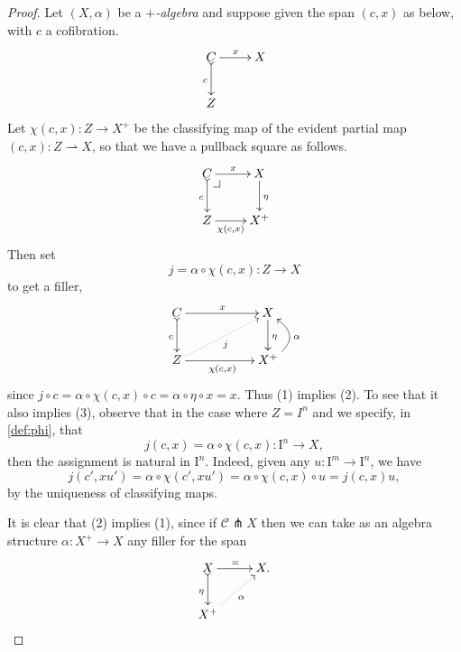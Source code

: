 \documentclass[11pt]{article}
\makeatletter
\newcommand{\pbcorner}[1][dr]{\save*!/#1-1.2pc/#1:(-1,1)@^{|-}\restore}
\newcommand{\I}{\ensuremath{\mathrm{I}}}
\theoremstyle{remark}
\theoremstyle{definition}
\makeatother
\begin{document}
\begin{proof}
Let $(X, \alpha)$ be a \emph{$+$-algebra} and suppose given the span $(c,x)$ as below, with $c$ a cofibration. 
\begin{equation*}%
\xymatrix{
C \ar@{>->}[d]_{c} \ar[r]^{x} & X \\
Z &
}
\end{equation*}
Let $\chi(c,x): Z\to X^+$ be the classifying map of the evident partial map $(c,x) : Z\rightharpoonup X$, so that we have a pullback square as follows.
\begin{equation}\label{diagram:defphi}
\xymatrix{
C \ar@{>->}[d]_{c} \ar[r]^{x} \pbcorner & X \ar[d]^{\eta} \\
Z \ar[r]_-{\chi(c,x)} & X^+
}
\end{equation}
Then set
\begin{equation}\label{def:phi}
j = \alpha\circ\chi(c,x) : Z\to X
\end{equation}
to get a filler,
\begin{equation}\label{diagram:defphi}
\xymatrix{
C \ar@{>->}[d]_{c} \ar[rr]^{x} && X \ar[d]^{\eta} \\
Z\ar@{.>}[rru]_{j} \ar[rr]_{\chi(c,x)} && X^+  \ar@/_4ex/ [u]_\alpha
}
\end{equation}
since $j\circ c = \alpha\circ\chi(c,x)\circ c = \alpha\circ\eta \circ x = x$. Thus (1) implies (2).  To see that it also implies (3), observe that in the case where $Z=I^n$ and we specify, in \eqref{def:phi}, that
\begin{equation}\label{def:j}
j(c,x) = \alpha\circ\chi(c,x) : \I^n\to X,
\end{equation}
then the assignment is natural in $\I^n$. Indeed,  given any $u : \I^m \to \I^n$, we have
\begin{equation}\label{eq:proof,uniformfillers}
j(c',xu') = \alpha\circ\chi(c',xu') = \alpha\circ\chi(c,x)\circ u = j(c,x) u,
\end{equation}
by the uniqueness of classifying maps.

It is clear that (2) implies (1), since if $\mathcal{C} \pitchfork X$ then we can take as an algebra structure $\alpha : X^+ \to X$ any filler for the span
\[
\xymatrix{
X \ar@{>->}[d]_{\eta} \ar[r]^{=} & X .\\
X^+ \ar@{.>}[ru]_\alpha&
}
\]


\end{proof}
\end{document}
